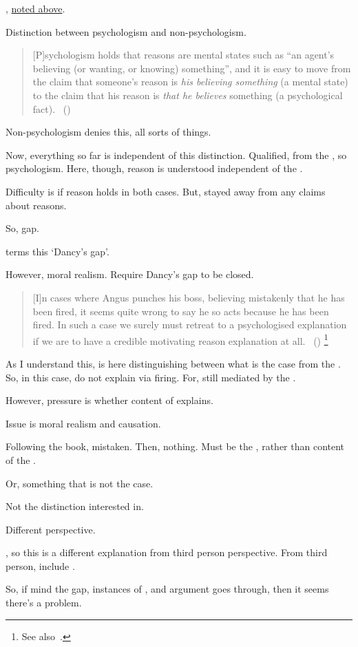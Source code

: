\begin{note}
  \citeauthor{Dancy:2000aa}, \hyperref[dancy-to-return]{noted above}.

  Distinction between psychologism and non-psychologism.

  \begin{quote}
    [P]sychologism holds that reasons are mental states such as “an agent’s believing (or wanting, or knowing) something”, and it is easy to move from the claim that someone’s reason is \emph{his believing something} (a mental state) to the claim that his reason is \emph{that he believes} something (a psychological fact).%
    \mbox{ }\hfill\mbox{(\citeauthor[\S3]{Alvarez:2017vr})}
  \end{quote}

  Non-psychologism denies this, all sorts of things.

  Now, everything so far is independent of this distinction.
  Qualified, from the \agpe{}, so psychologism.
  Here, though, reason is understood independent of the \agpe{}.

  Difficulty is if reason holds in both cases.
  But, stayed away from any claims about reasons.

  So, gap.

  \citeauthor{Hieronymi:2011aa} terms this `Dancy's gap'.

  However, moral realism.
  Require Dancy's gap to be closed.

  \begin{quote}
    [I]n cases where Angus punches his boss, believing mistakenly that he has been fired, it seems quite wrong to say he so acts because he has been fired.
    In such a case we surely must retreat to a psychologised explanation if we are to have a credible motivating reason explanation at all.%
    \mbox{ }\hfill\mbox{(\citeyear[\S6]{Lenman:2011wy})}%
    \footnote{
      See also~\textcite[\S2]{Alvarez:2017vr}.
    }
  \end{quote}

  As I understand this, \citeauthor{Dancy:2000aa} is here distinguishing between what is the case from the \agpe{}.
  So, in this case, do not explain via firing.
  For, still mediated by the \agpe{}.

  However, pressure is whether content of \agpe{} explains.

  Issue is moral realism and causation.

  Following the book, mistaken.
  Then, nothing.
  Must be the \agpe{}, rather than content of the \agpe{}.

  Or, something that is not the case.

  Not the distinction interested in.

  Different perspective.

  \agpe{}, so this is a different explanation from third person perspective.
  From third person, include \agpe{}.

  So, if mind the gap, instances of \qzS{}, and argument goes through, then it seems there's a problem.
\end{note}

